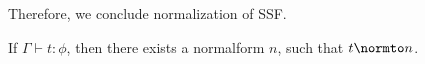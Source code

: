 \noindent Therefore, we conclude normalization of SSF.
\begin{corollary}[Normalization]
  If $\Gamma \vdash t:\phi$, then there exists a normalform $n$, such
  that $t \normto n$.
\end{corollary}

